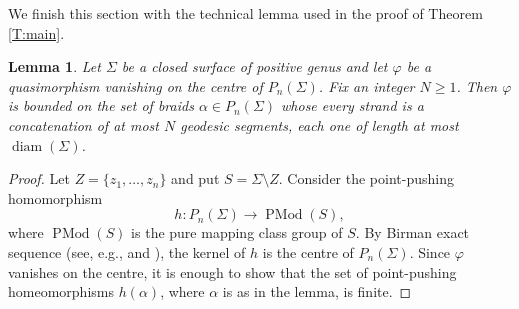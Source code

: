 \documentclass[11pt]{amsart}
\newtheorem{lemma}[subsection]{Lemma}
\theoremstyle{definition}
\theoremstyle{remark}
\numberwithin{equation}{section}
\numberwithin{figure}{section}
\begin{document}
We finish this section with the technical lemma used in the proof of Theorem \ref{T:main}.

\begin{lemma}\label{L:fin_many_values}
Let $\Sigma$ be a closed surface of positive genus 
and let $\varphi$ be a quasimorphism vanishing on the centre of $P_n(\Sigma)$. 
Fix an integer $N\geq 1$. Then $\varphi$ is bounded on the set of braids $\alpha\in P_n(\Sigma)$ whose
every strand is a concatenation of at most $N$ geodesic segments, each one of
length at most $\operatorname{diam}(\Sigma)$.
\end{lemma}

\begin{proof}
Let \(Z=\{z_1,\ldots,z_n\}\) and put \(S=\Sigma\setminus Z\). Consider the point-pushing homomorphism
\[
h \colon P_n(\Sigma)\longrightarrow \operatorname{PMod}(S),
\]
where $\operatorname{PMod}(S)$ is the pure mapping class group of $S$. 
By Birman exact sequence (see, e.g., \cite{MR243519} and \cite{MR2850125}), 
the kernel of $h$ is the centre of $P_n(\Sigma)$. 
Since $\varphi$ vanishes on the centre, it is enough to 
show that the set of point-pushing homeomorphisms $h(\alpha)$, 
where $\alpha$ is as in the lemma, is finite. 


\end{proof}
\end{document}
